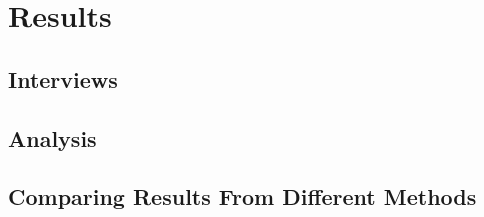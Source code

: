 \documentclass[../thesis.tex]{subfiles}
\begin{document}
\chapter{Results}\label{results}
\section{Interviews}
\section{Analysis}
\section{Comparing Results From Different Methods}
\end{document}
